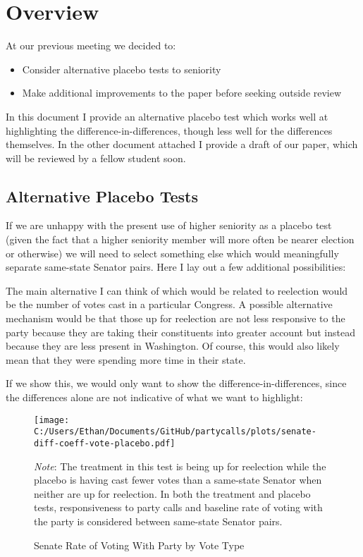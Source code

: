 \documentclass[12pt]{article}
\newcommand\fnote[1]{\captionsetup{font=small}\caption*{#1}}
\begin{document}
\section{Overview}

At our previous meeting we decided to:

\begin{itemize}
	\item Consider alternative placebo tests to seniority
	
	\item Make additional improvements to the paper before seeking outside review
\end{itemize}

In this document I provide an alternative placebo test which works well at highlighting the difference-in-differences, though less well for the differences themselves. In the other document attached I provide a draft of our paper, which will be reviewed by a fellow student soon.

\subsection{Alternative Placebo Tests}

If we are unhappy with the present use of higher seniority as a placebo test (given the fact that a higher seniority member will more often be nearer election or otherwise) we will need to select something else which would meaningfully separate same-state Senator pairs. Here I lay out a few additional possibilities:

The main alternative I can think of which would be related to reelection would be the number of votes cast in a particular Congress. A possible alternative mechanism would be that those up for reelection are not less responsive to the party because they are taking their constituents into greater account but instead because they are less present in Washington. Of course, this would also likely mean that they were spending more time in their state.

If we show this, we would only want to show the difference-in-differences, since the differences alone are not indicative of what we want to highlight:

\begin{figure}[H]
	\centering
	\caption{Senate Rate of Voting With Party by Vote Type}
	\texttt{[image: C:/Users/Ethan/Documents/GitHub/partycalls/plots/senate-diff-coeff-vote-placebo.pdf]}
	\fnote{\textit{Note}: The treatment in this test is being up for reelection while the placebo is having cast fewer votes than a same-state Senator when neither are up for reelection. In both the treatment and placebo tests, responsiveness to party calls and baseline rate of voting with the party is considered between same-state Senator pairs.}
\end{figure}
\end{document}
